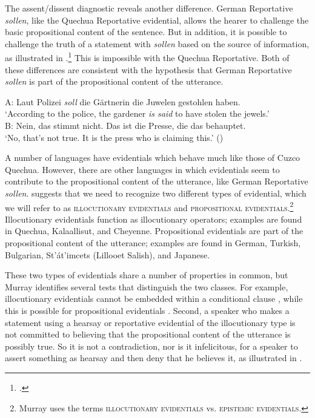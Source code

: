The assent/dissent diagnostic reveals another difference. German Reportative \textit{sollen}, like the Quechua Reportative evidential, allows the hearer to challenge the basic propositional content of the sentence. But in addition, it is possible to challenge the truth of a statement with \textit{sollen} based on the source of information, as illustrated in .\footnote{\citet{Faller2006}.} This is impossible with the Quechua Reportative. Both of these differences are consistent with the hypothesis that German Reportative \textit{sollen} is part of the propositional content of the utterance.


\ea
A: Laut Polizei \textit{soll} die Gärtnerin die Juwelen gestohlen haben.\\
   ‘According to the police, the gardener \textit{is said} to have stolen the jewels.’\\
B: Nein, das stimmt nicht. Das ist die Presse, die das behauptet.\\
   ‘No, that’s not true. It is the press who is claiming this.’  (\citealt{Faller2006})
\z


A number of languages have evidentials which behave much like those of Cuzco Quechua. However, there are other languages in which evidentials seem to contribute to the propositional content of the utterance, like German Reportative \textit{sollen}. \citet{Murray2010} suggests that we need to recognize two different types of evidential, which we will refer to as \textsc{illocutionary evidentials} and \textsc{propositional evidentials}.\footnote{Murray uses the terms \textsc{illocutionary evidentials} vs. \textsc{epistemic evidentials}.} Illocutionary evidentials function as illocutionary operators; examples are found in Quechua, Kalaallisut, and Cheyenne. Propositional evidentials are part of the propositional content of the utterance; examples are found in German, Turkish, Bulgarian, St’át’imcets (Lillooet Salish), and Japanese.



These two types of evidentials share a number of properties in common, but Murray identifies several tests that distinguish the two classes. For example, illocutionary evidentials cannot be embedded within a conditional clause , while this is possible for propositional evidentials . Second, a speaker who makes a statement using a hearsay or reportative evidential of the illocutionary type is not committed to believing that the propositional content of the utterance is possibly true. So it is not a contradiction, nor is it infelicitous, for a speaker to assert something as hearsay and then deny that he believes it, as illustrated in .



